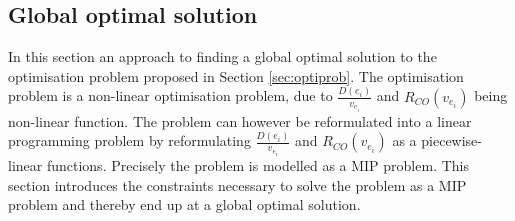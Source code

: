 \subsection{Global optimal solution}
In this section an approach to finding a global optimal solution to the optimisation problem proposed in Section \ref{sec:optiprob}. The optimisation problem is a non-linear optimisation problem, due to $\frac{D(e_i)}{v_{e_i}}$ and $R_{CO}(v_{e_i})$ being non-linear function. The problem can however be reformulated into a linear programming problem by reformulating $\frac{D(e_i)}{v_{e_i}}$ and $R_{CO}(v_{e_i})$ as a piecewise-linear functions. Precisely the problem is modelled as a MIP problem. This section introduces the constraints necessary to solve the problem as a MIP problem and thereby end up at a global optimal solution.

